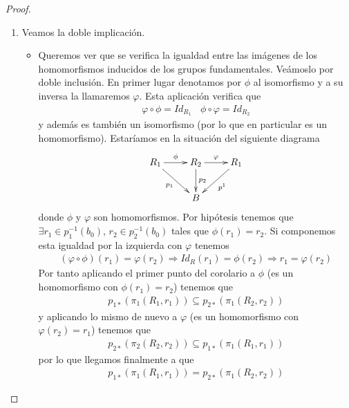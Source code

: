 \begin{coro}
\begin{proof}
\begin{enumerate}
            \item Veamos la doble implicación. 
            \begin{itemize}
                \item[$\Rightarrow$)] Queremos ver que se verifica la igualdad entre las imágenes de los homomorfismos inducidos de los grupos fundamentales. Veámoslo por doble inclusión. En primer lugar denotamos por $\phi$ al isomorfismo y a su inversa la llamaremos $\varphi$. Esta aplicación verifica  que
                \begin{gather*}
                    \varphi \circ \phi = Id_{R_1} \ \ \ \ \phi \circ \varphi = Id_{R_2}
                \end{gather*}
                y además es también un isomorfismo (por lo que en particular es un homomorfismo). Estaríamos en la situación del siguiente diagrama
                \begin{gather*}
                    \xymatrix{
                        R_1 \ar[r]^{\phi} \ar[dr]_{p_1} & R_2 \ar[d]^{p_2} \ar[r]^{\varphi} & R_1\ar[dl]^{p^1} \\
                        & B
                    }
                \end{gather*}
                donde $\phi$ y $\varphi$ son homomorfismos. Por hipótesis tenemos que $\exists r_1\in p_1^{-1}(b_0)$, $r_2\in p_2^{-1}(b_0)$ tales que $\phi(r_1)=r_2$. Si componemos esta igualdad por la izquierda con $\varphi$ tenemos
                \begin{gather*}
                    (\varphi \circ \phi) (r_1) = \varphi(r_2) \Rightarrow Id_R(r_1) = \phi(r_2) \Rightarrow r_1 = \varphi(r_2)
                \end{gather*}
                Por tanto aplicando el primer punto del corolario a $\phi$ (es un homomorfismo con $\phi(r_1)=r_2$) tenemos que 
                \begin{gather*}
                    p_{1*}(\pi_1(R_1,r_1)) \subseteq p_{2*}(\pi_1(R_2,r_2))
                \end{gather*}
                y aplicando lo mismo de nuevo a $\varphi$ (es un homomorfismo con $\varphi(r_2)=r_1$) tenemos que 
                \begin{gather*}
                    p_{2*}(\pi_2(R_2,r_2)) \subseteq p_{1*}(\pi_1(R_1,r_1))
                \end{gather*}
                por lo que llegamos finalmente a que 
                \begin{gather*}
                    p_{1*}(\pi_1(R_1,r_1)) = p_{2*}(\pi_1(R_2,r_2))
                \end{gather*}


\end{itemize}
\end{enumerate}
\end{proof}
\end{coro}
